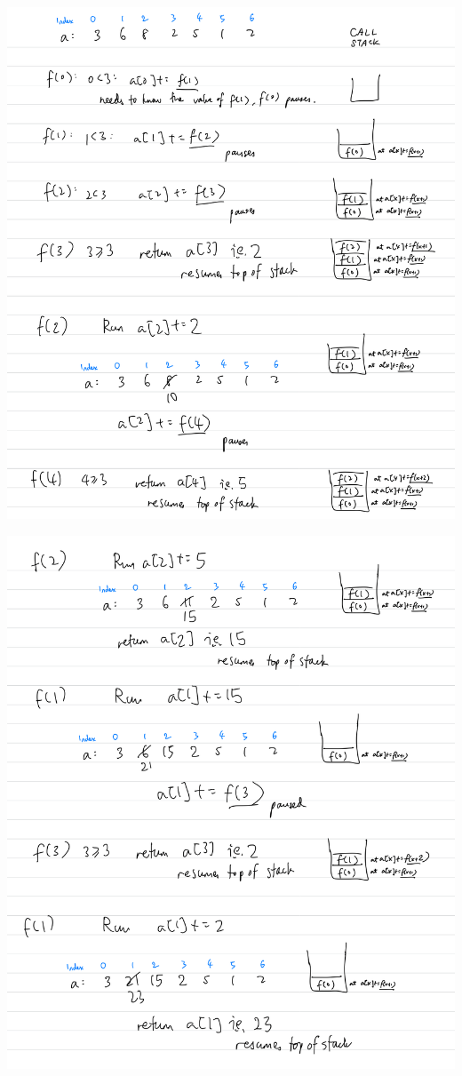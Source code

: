 \includegraphics[width=15cm]{images/ch4-rec1.png}

\includegraphics[width=15cm]{images/ch4-rec2.png}

